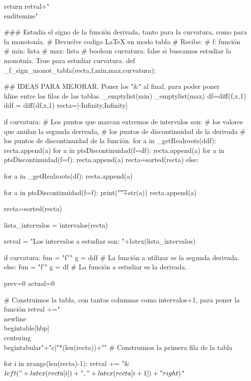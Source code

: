 \begin{sagesilent}
 
 return retval+"\\end{itemize}"

### Estudia el signo de la función derivada, tanto para la curvatura, como para la monotonía.
# Devuelve codigo LaTeX en modo tabla
# Recibe:
# f: función
# min: lista
# max: lista
# boolean curvatura: false si buscamos estudiar la monotnía. True para estudiar curvatura.
def _f_sign_monot_tabla(recta,f,min,max,curvatura):

## IDEAS PARA MEJORAR. Poner los "&" al final, para poder poner \\hline entre las filas de las tablas.
 _emptylist(min)
 _emptylist(max)
 df=diff(f,x,1)
 ddf = diff(df,x,1)
 recta=[-Infinity,Infinity]
 
 
 if curvatura:
    # Los puntos que marcan extremos de intervalos son:
    #       los valores que anulan la segunda derivada, 
    #       los puntos de discontinuidad de la derivada 
    #       los puntos de discontinuidad de la función.
    for a in _getRealroots(ddf):
        recta.append(a)
    for a in ptsDiscontinuidad(f=df):
        recta.append(a)
    for a in ptsDiscontinuidad(f=f):
        recta.append(a)
    recta=sorted(recta) 
 else:
    
    for a in _getRealroots(df):
        recta.append(a)
    
    for a in ptsDiscontinuidad(f=f):
        print("\t"+str(a))
        recta.append(a)
    
    
    recta=sorted(recta) 
    
 lista_intervalos = intervalos(recta)

 retval = "Los intervalos a estudiar son: "+latex(lista_intervalos)
 

 if curvatura:
    fun = "f''"
    g = ddf # La función a utilizar es la segunda derivada.
 else:
    fun = "f'"
    g = df # La función a estudiar es la derivada.

 prev=0
 actual=0
 
 # Construimos la tabla, con tantas columnas como intervalos+1, para poner la función
 retval +="\\newline\\begin{table}[hbp]\\centering\\begin{tabular}{"+"c|"*(len(recta))+"}"
 # Construimos la primera fila de la tabla
 
 
 for i in xrange(len(recta)-1):
  retval += "& $\\left("+latex(recta[i])+","+latex(recta[i+1])+"\\right)$"


\end{sagesilent}
